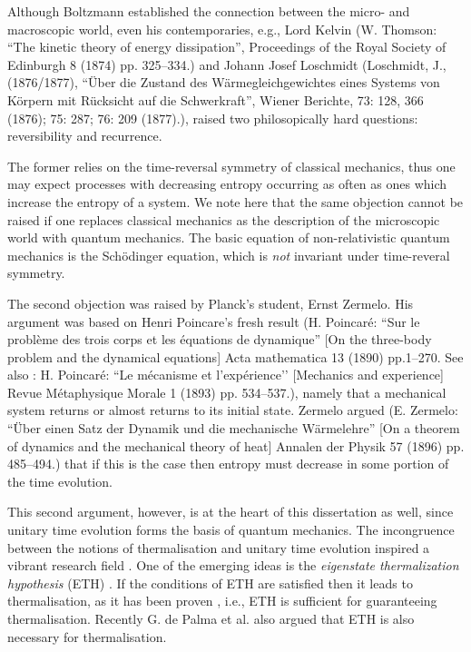 \documentclass[a4paper, 10pt]{article}
\theoremstyle{plain}
\begin{document}
Although Boltzmann established the connection between the micro- and macroscopic
world, even his contemporaries, e.g., Lord Kelvin (W. Thomson: ``The kinetic
theory of energy dissipation'', Proceedings of the Royal Society of Edinburgh 8
(1874) pp. 325–334.) and Johann Josef Loschmidt (Loschmidt, J., (1876/1877),
``Über die Zustand des Wärmegleichgewichtes eines Systems von Körpern mit
Rücksicht auf die Schwerkraft'', Wiener Berichte, 73: 128, 366 (1876); 75: 287;
76: 209 (1877).), raised two philosopically hard questions: reversibility and
recurrence.

The former relies on the time-reversal symmetry of classical mechanics, thus one
may expect processes with decreasing entropy occurring as often as ones which
increase the entropy of a system. We note here that the same objection cannot be
raised if one replaces classical mechanics as the description of the microscopic
world with quantum mechanics. The basic equation of non-relativistic quantum
mechanics is the Sch{\"o}dinger equation, which is {\emph{not}} invariant under
time-reveral symmetry.

The second objection was raised by Planck's student, Ernst Zermelo. His argument
was based on Henri Poincare's fresh result (H. Poincaré: ``Sur le problème des
trois corps et les équations de dynamique'' [On the three-body problem and the
dynamical equations] Acta mathematica 13 (1890) pp.1–270. See also : H. Poincaré:
``Le mécanisme et l’expérience’’ [Mechanics and experience] Revue Métaphysique
Morale 1 (1893) pp. 534–537.), namely that a mechanical system returns or almost
returns to its initial state. Zermelo argued (E. Zermelo: ``Über einen Satz der
Dynamik und die mechanische Wärmelehre'' [On a theorem of dynamics and the
mechanical theory of heat] Annalen der Physik 57 (1896) pp. 485–494.) that if
this is the case then entropy must decrease in some portion of the time
evolution.

This second argument, however, is at the heart of this dissertation as well,
since unitary time evolution forms the basis of quantum mechanics. The
incongruence between the notions of thermalisation and unitary time evolution
inspired a vibrant research field \cite{Calabrese2006, Cazalilla2006, Rigol2007,
Palma2015}. One of the emerging ideas is the {\emph{eigenstate thermalization
hypothesis}} (ETH) \cite{}. If the conditions of ETH are satisfied then it leads
to thermalisation, as it has been proven \cite{}, i.e., ETH is sufficient for
guaranteeing thermalisation. Recently G. de Palma et al. also argued
\cite{Palma2015} that ETH is also necessary for thermalisation.
\end{document}
